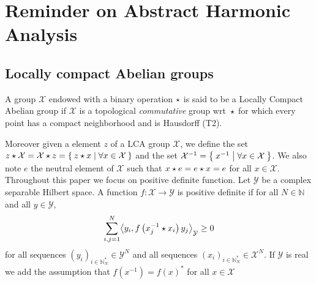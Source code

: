 \section{Reminder on Abstract Harmonic Analysis}\label{app:theorem}
\label{sec:abstract_harmonic}
\subsection{Locally compact Abelian groups}
\begin{definition}
    A group $\mathcal{X}$ endowed with a binary operation $\star$ is said to
    be a Locally Compact Abelian group if $\mathcal{X}$ is a topological
    \emph{commutative} group \acs{wrt}~$\star$ for which every point has a
    compact neighborhood and is Hausdorff (T2).
\end{definition}
Moreover given a element $z$ of a \ac{LCA} group $\mathcal{X}$, we define the
set $z\star\mathcal{X}=\mathcal{X}\star z=\Set{z\star x|\forall
x\in\mathcal{X}}$ and the set $\mathcal{X}^{-1}=\Set{x^{-1}|\forall
x\in\mathcal{X}}$.  We also note $e$ the neutral element of $\mathcal{X}$ such
that $x\star e=e \star x= e$ for all $x\in\mathcal{X}$.  Throughout this
paper we focus on positive definite function. Let $\mathcal{Y}$ be a complex
separable Hilbert space. A function $f:\mathcal{X}\to\mathcal{Y}$ is positive
definite if for all $N\in\mathbb{N}$ and all $y\in\mathcal{Y}$,
\begin{dmath}
    \label{eq:positive_definite} \sum_{i,j=1}^N\inner*{y_i,
    f\left(x_j^{-1}\groupop x_i\right)y_j}_{\mathcal{Y}}\ge 0
\end{dmath}
for all sequences $(y_i)_{i\in\mathbb{N}_N^*}\in\mathcal{Y}^N$ and all sequences
$(x_i)_{i\in\mathbb{N}_N^*}\in\mathcal{X}^N$. If $\mathcal{Y}$ is real we add
the assumption that $f(x^{-1})=f(x)^*$ for all $x\in\mathcal{X}$

